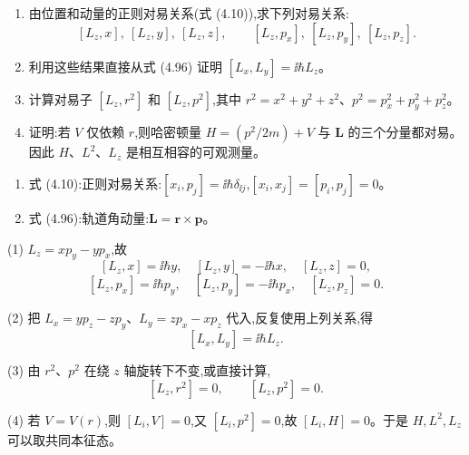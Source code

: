 \begin{question}
\begin{enumerate}
\item 由位置和动量的正则对易关系(式 (4.10)),求下列对易关系:
\[
[L_z,x],\ [L_z,y],\ [L_z,z],\qquad
[L_z,p_x],\ [L_z,p_y],\ [L_z,p_z].
\]
\item 利用这些结果直接从式 (4.96) 证明 $[L_x,L_y]=\ii\hbar L_z$。
\item 计算对易子 $[L_z,r^2]$ 和 $[L_z,p^2]$,其中 $r^2=x^2+y^2+z^2$、$p^2=p_x^2+p_y^2+p_z^2$。
\item 证明:若 $V$ 仅依赖 $r$,则哈密顿量 $H=(p^2/2m)+V$ 与 $\mathbf L$ 的三个分量都对易。因此 $H$、$L^2$、$L_z$ 是相互相容的可观测量。
\end{enumerate}

\par\smallskip
{}
\begin{enumerate}[leftmargin=2.2em,itemsep=0.12em,topsep=0.12em,parsep=0pt]
\item 式 (4.10):正则对易关系:$[x_i,p_j]=\ii\hbar\delta_{\ii j}$,$[x_i,x_j]=[p_i,p_j]=0$。
\item 式 (4.96):轨道角动量:$\mathbf L=\mathbf r\times\mathbf p$。
\end{enumerate}

\end{question}
\begin{solution}

(1) $L_z=xp_y-yp_x$,故
\[
[L_z,x]=\ii\hbar y,
\quad [L_z,y]=-\ii\hbar x,
\quad [L_z,z]=0,
\]
\[
[L_z,p_x]=\ii\hbar p_y,
\quad [L_z,p_y]=-\ii\hbar p_x,
\quad [L_z,p_z]=0.
\]

(2) 把 $L_x=yp_z-zp_y$、$L_y=zp_x-xp_z$ 代入,反复使用上列关系,得
\[
[L_x,L_y]=\ii\hbar L_z.
\]

(3) 由 $r^2$、$p^2$ 在绕 $z$ 轴旋转下不变,或直接计算,
\[
[L_z,r^2]=0,
\qquad [L_z,p^2]=0.
\]

(4) 若 $V=V(r)$,则 $[L_i,V]=0$,又 $[L_i,p^2]=0$,故 $[L_i,H]=0$。于是 $H,L^2,L_z$ 可以取共同本征态。

\end{solution}

